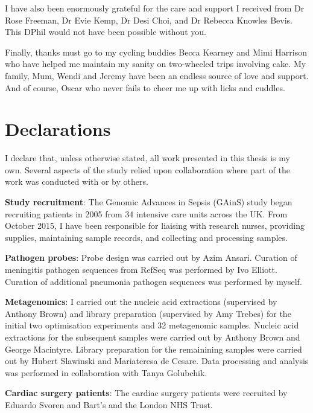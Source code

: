 I have also been enormously grateful for the care and support I received from Dr Rose Freeman, Dr Evie Kemp, Dr Desi Choi, and Dr Rebecca Knowles Bevis. This DPhil would not have been possible without you. 

Finally, thanks must go to my cycling buddies Becca Kearney and Mimi Harrison who have helped me maintain my sanity on two-wheeled trips involving cake. My family, Mum, Wendi and Jeremy have been an endless source of love and support. And of course, Oscar who never fails to cheer me up with licks and cuddles.







\newpage
\chapter*{Declarations}
\thispagestyle{plain}
\noindent

I declare that, unless otherwise stated, all work presented in this thesis is my own. Several aspects of the study relied upon collaboration where part of the work was conducted with or by others.

\textbf{Study recruitment}: The Genomic Advances in Sepsis (GAinS) study began recruiting patients in 2005 from 34 intensive care units across the UK. From October 2015, I have been responsible for liaising with research nurses, providing supplies, maintaining sample records, and collecting and processing samples.

\textbf{Pathogen probes}: Probe design was carried out by Azim Ansari. Curation of meningitis pathogen sequences from RefSeq was performed by Ivo Elliott. Curation of additional pneumonia pathogen sequences was performed by myself. 

\textbf{Metagenomics}: I carried out the nucleic acid extractions (supervised by Anthony Brown) and library preparation (supervised by Amy Trebes) for the initial two optimisation experiments and 32 metagenomic samples. Nucleic acid extractions for the subsequent samples were carried out by Anthony Brown and George Macintyre. Library preparation for the remainining samples were carried out by Hubert Slawinski and Mariateresa de Cesare. Data processing and analysis was performed in collaboration with Tanya Golubchik.

\textbf{Cardiac surgery patients}: The cardiac surgery patients were recruited by Eduardo Svoren and Bart's and the London NHS Trust.

